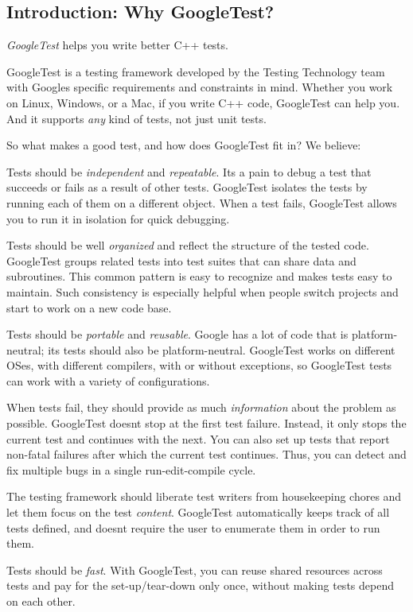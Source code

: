 \subsection*{Introduction\+: Why Google\+Test?}

{\itshape Google\+Test} helps you write better C++ tests.

Google\+Test is a testing framework developed by the Testing Technology team with Google\textquotesingle{}s specific requirements and constraints in mind. Whether you work on Linux, Windows, or a Mac, if you write C++ code, Google\+Test can help you. And it supports {\itshape any} kind of tests, not just unit tests.

So what makes a good test, and how does Google\+Test fit in? We believe\+:


\begin{DoxyEnumerate}
\item Tests should be {\itshape independent} and {\itshape repeatable}. It\textquotesingle{}s a pain to debug a test that succeeds or fails as a result of other tests. Google\+Test isolates the tests by running each of them on a different object. When a test fails, Google\+Test allows you to run it in isolation for quick debugging.
\item Tests should be well {\itshape organized} and reflect the structure of the tested code. Google\+Test groups related tests into test suites that can share data and subroutines. This common pattern is easy to recognize and makes tests easy to maintain. Such consistency is especially helpful when people switch projects and start to work on a new code base.
\item Tests should be {\itshape portable} and {\itshape reusable}. Google has a lot of code that is platform-\/neutral; its tests should also be platform-\/neutral. Google\+Test works on different O\+Ses, with different compilers, with or without exceptions, so Google\+Test tests can work with a variety of configurations.
\item When tests fail, they should provide as much {\itshape information} about the problem as possible. Google\+Test doesn\textquotesingle{}t stop at the first test failure. Instead, it only stops the current test and continues with the next. You can also set up tests that report non-\/fatal failures after which the current test continues. Thus, you can detect and fix multiple bugs in a single run-\/edit-\/compile cycle.
\item The testing framework should liberate test writers from housekeeping chores and let them focus on the test {\itshape content}. Google\+Test automatically keeps track of all tests defined, and doesn\textquotesingle{}t require the user to enumerate them in order to run them.
\item Tests should be {\itshape fast}. With Google\+Test, you can reuse shared resources across tests and pay for the set-\/up/tear-\/down only once, without making tests depend on each other.
\end{DoxyEnumerate}

